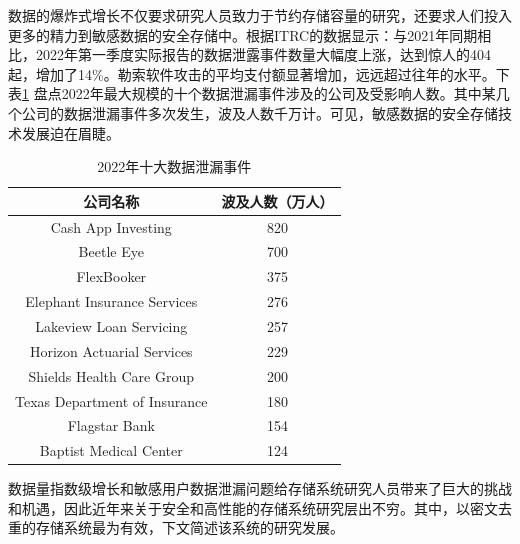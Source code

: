 \documentclass[promaster]{thesis-uestc}
\begin{document}
数据的爆炸式增长不仅要求研究人员致力于节约存储容量的研究，还要求人们投入更多的精力到敏感数据的安全存储中。根据\acrlong{ITRC}的数据显示：与2021年同期相比，2022年第一季度实际报告的数据泄露事件数量大幅度上涨，达到惊人的404起，增加了14\%。勒索软件攻击的平均支付额显著增加，远远超过往年的水平。下表\ref{2022年十大数据泄漏事件}
盘点2022年最大规模的十个数据泄漏事件涉及的公司及受影响人数。其中某几个公司的数据泄漏事件多次发生，波及人数千万计。可见，敏感数据的安全存储技术发展迫在眉睫。

\begin{table}[htbp]
    \begin{center}
        \caption{2022年十大数据泄漏事件}
        \label{2022年十大数据泄漏事件}
        \begin{tabular}{|c|c|}
            \hline
            \textbf{公司名称}                 & \textbf{波及人数（万人）} \\
            \hline
            Cash App Investing            & 820               \\
            \hline
            Beetle Eye                    & 700               \\
            \hline
            FlexBooker                    & 375               \\
            \hline
            Elephant Insurance Services   & 276               \\
            \hline
            Lakeview Loan Servicing       & 257               \\
            \hline
            Horizon Actuarial Services    & 229               \\
            \hline
            Shields Health Care Group     & 200               \\
            \hline
            Texas Department of Insurance & 180               \\
            \hline
            Flagstar Bank                 & 154               \\
            \hline
            Baptist Medical Center        & 124               \\
            \hline
        \end{tabular}
    \end{center}
\end{table}

数据量指数级增长和敏感用户数据泄漏问题给存储系统研究人员带来了巨大的挑战和机遇，因此近年来关于安全和高性能的存储系统研究层出不穷。其中，以密文去重的存储系统最为有效，下文简述该系统的研究发展。
\end{document}
